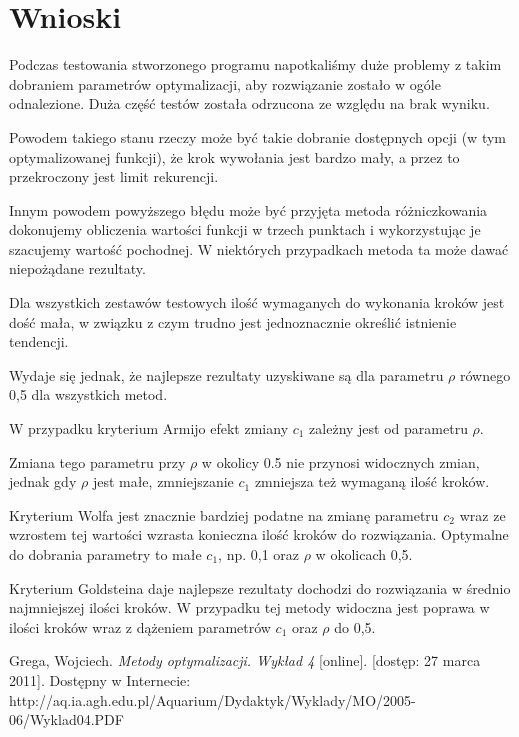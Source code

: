 \documentclass{classrep}
\begin{document}
\section{Wnioski}
Podczas testowania stworzonego programu napotkaliśmy duże problemy z takim dobraniem parametrów optymalizacji, aby rozwiązanie zostało w ogóle odnalezione. Duża część testów została odrzucona ze względu na brak wyniku.

Powodem takiego stanu rzeczy może być takie dobranie dostępnych opcji (w tym optymalizowanej funkcji), że krok wywołania jest bardzo mały, a przez to przekroczony jest limit rekurencji.

Innym powodem powyższego błędu może być przyjęta metoda różniczkowania \ppauza dokonujemy obliczenia wartości funkcji w trzech punktach i wykorzystując je szacujemy wartość pochodnej. W niektórych przypadkach metoda ta może dawać niepożądane rezultaty.

\smallskip

Dla wszystkich zestawów testowych ilość wymaganych do wykonania kroków jest dość mała, w związku z czym trudno jest jednoznacznie określić istnienie tendencji.

Wydaje się jednak, że najlepsze rezultaty uzyskiwane są dla parametru $\rho$ równego 0,5 dla wszystkich metod.

\smallskip

W przypadku kryterium Armijo efekt zmiany $c_1$ zależny jest od parametru $\rho$.

Zmiana tego parametru przy $\rho$ w okolicy 0.5 nie przynosi widocznych zmian, jednak gdy $\rho$ jest małe, zmniejszanie $c_1$ zmniejsza też wymaganą ilość kroków.

\smallskip

Kryterium Wolfa jest znacznie bardziej podatne na zmianę parametru $c_2$ \ppauza wraz ze wzrostem tej wartości wzrasta konieczna ilość kroków do rozwiązania. Optymalne do dobrania parametry to małe $c_1$, np. 0,1 oraz $\rho$ w okolicach 0,5.

\smallskip

Kryterium Goldsteina daje najlepsze rezultaty \ppauza dochodzi do rozwiązania w średnio najmniejszej ilości kroków. W przypadku tej metody widoczna jest poprawa w ilości kroków wraz z dążeniem parametrów $c_1$ oraz $\rho$ do 0,5.

\begin{thebibliography}{99}
Grega, Wojciech. \textit{Metody optymalizacji. Wykład 4} [online]. [dostęp: 27
marca 2011]. Dostępny w Internecie:
http://aq.ia.agh.edu.pl/Aquarium/Dydaktyk/Wyklady/MO/2005-06/Wyklad04.PDF
\end{thebibliography}
\end{document}

